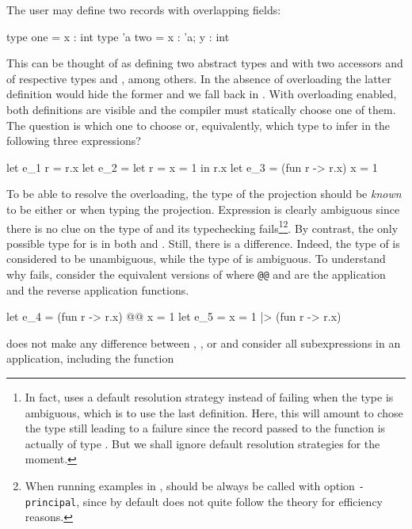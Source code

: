 \documentclass[acmsmall,screen,nonacm]{acmart}
\begin{document}
The user may define two records with overlapping fields:
\begin{program}[input]
type one = {x : int}
type 'a two = {x : 'a; y : int}
\end{program}
This can be thought of as defining two abstract types  and
 with two accessors  and  of
respective types  and , among
others.
%
In the absence of overloading the latter definition would hide the former
and we fall back in \ML. With overloading enabled, both definitions are
visible and the compiler must statically choose one of them.
%
The question is which one to choose or, equivalently, which type to infer
in the following three expressions?
\begin{program}[input]
let e_1 r = r.x
let e_2 = let r = {x = 1} in r.x
let e_3 = (fun r -> r.x) {x = 1}
\end{program}
To be able to resolve the overloading, the type of the projection should be
\emph{known} to be either  or  when typing the
projection.  Expression  is clearly ambiguous since
there is no clue on the type of  and its typechecking
fails\footnote {In fact, \OCaml uses a default resolution strategy instead
of failing when the type is ambiguous, which is to use the last
definition. Here, this will amount to chose the type 
still leading to a failure since the record passed to the function is
actually of type . But we shall ignore default resolution
strategies for the moment.}\footnote {When running examples in \OCaml,
\OCaml should be always be called with option \texttt{-principal}, since by
default \OCaml does not quite follow the theory for efficiency reasons.}.
%
By contrast, the only possible
type for  is  in both  and .
Still, there is a difference.  Indeed, the type of  is considered
to be unambiguous, while the type of  is ambiguous. To
understand why  fails, consider the equivalent versions of
 where \texttt{@@} and \ocaml{|>} are the application and the
reverse application functions.
\begin{program}[input,escapechar={}]
let e_4 = (fun r -> r.x) @@ {x = 1}
let e_5 = {x = 1} |> (fun r -> r.x)
\end{program}
\OCaml  does not make any difference between
, , or 
and consider all subexpressions in an application, including the function
\end{document}
